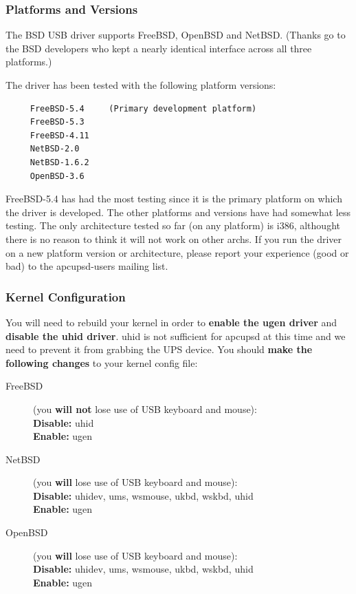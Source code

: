 \subsubsection*{Platforms and Versions}

The \*BSD USB driver supports FreeBSD, OpenBSD and NetBSD. (Thanks go to 
the \*BSD developers who kept a nearly identical interface across all 
three platforms.)  

The driver has been tested with the following platform versions: 

\begin{verbatim}
     FreeBSD-5.4     (Primary development platform)
     FreeBSD-5.3
     FreeBSD-4.11
     NetBSD-2.0
     NetBSD-1.6.2
     OpenBSD-3.6
\end{verbatim}

FreeBSD-5.4 has had the most testing since it is the primary platform on which
the driver is developed. The other platforms and versions have had somewhat
less testing. The only architecture tested so far (on any platform) is i386,
althought there is no reason to think it will not work on other archs. If you
run the driver on a new platform version or architecture, please report your
experience (good or bad) to the apcupsd-users mailing list.  

\subsubsection*{Kernel Configuration}

You will need to rebuild your kernel in order to {\bf enable the ugen driver}
and {\bf disable the uhid driver}. uhid is not sufficient for apcupsd at this
time and we need to prevent it from grabbing the UPS device. You should 
{\bf make the following changes} to your kernel config file:

\begin{description}
\item [FreeBSD]
(you {\bf will not} lose use of USB keyboard and mouse):
\\{\bf Disable:} uhid
\\{\bf Enable:} ugen

\item [NetBSD] (you {\bf will} lose use of USB keyboard and mouse):
\\{\bf Disable:} uhidev, ums, wsmouse, ukbd, wskbd, uhid  
\\{\bf Enable:} ugen

\item [OpenBSD] (you {\bf will} lose use of USB keyboard and mouse):
\\{\bf Disable:} uhidev, ums, wsmouse, ukbd, wskbd, uhid  
\\{\bf Enable:} ugen
\end{description}

